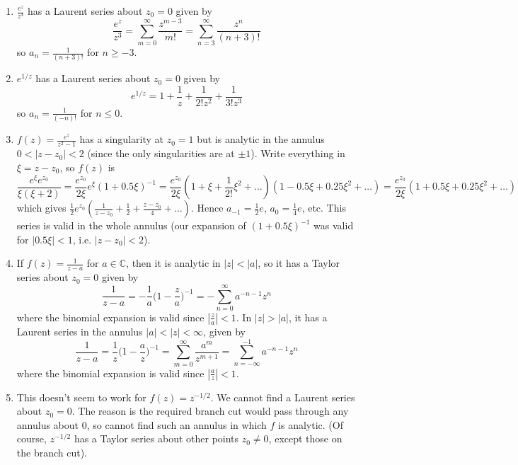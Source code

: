 \documentclass[a4paper]{article}
\begin{document}
\begin{eg}\leavevmode
\begin{enumerate}
    \item $\frac{e^z}{z^3}$ has a Laurent series about $z_0=0$ given by
    $$\frac{e^z}{z^3}=\sum_{m=0}^\infty\frac{z^{m-3}}{m!}=\sum_{n=3}^\infty\frac{z^n}{(n+3)!}$$
    so $a_n=\frac{1}{(n+3)!}$ for $n\geq-3$.
    \item $e^{1/z}$ has a Laurent series about $z_0=0$ given by
    $$e^{1/z}=1+\frac{1}{z}+\frac{1}{2!z^2}+\frac{1}{3!z^3}$$
    so $a_n=\frac{1}{(-n)!}$ for $n\leq 0$.
    \item $f(z)=\frac{e^z}{z^2-1}$ has a singularity at $z_0=1$ but is analytic in the annulus $0<|z-z_0|<2$ (since the only singularities are at $\pm 1$). Write everything in $\xi=z-z_0$, so $f(z)$ is
    $$\frac{e^\xi e^{z_0}}{\xi(\xi+2)}=\frac{e^{z_0}}{2\xi}e^\xi(1+0.5\xi)^{-1}=\frac{e^{z_0}}{2\xi}(1+\xi+\frac{1}{2!}\xi^2+\dots)(1-0.5\xi+0.25\xi^2+\dots)=\frac{e^{z_0}}{2\xi}(1+0.5\xi+0.25\xi^2+\dots)$$
    which gives $\frac{1}{2}e^{z_0}(\frac{1}{z-z_0}+\frac{1}{2}+\frac{z-z_0}{4}+\dots)$. Hence $a_{-1}=\frac{1}{2}e$, $a_0=\frac{1}{4}e$, etc. This series is valid in the whole annulus (our expansion of $(1+0.5\xi)^{-1}$ was valid for $|0.5\xi|<1$, i.e. $|z-z_0|<2$).
    \item If $f(z)=\frac{1}{z-a}$ for $a\in\mathbb{C}$, then it is analytic in $|z|<|a|$, so it has a Taylor series about $z_0=0$ given by
    $$\frac{1}{z-a}=-\frac{1}{a}\bigg(1-\frac{z}{a}\bigg)^{-1}=-\sum_{n=0}^\infty a^{-n-1}z^n$$
    where the binomial expansion is valid since $|\frac{z}{a}|<1$. In $|z|>|a|$, it has a Laurent series in the annulus $|a|<|z|<\infty$, given by
    $$\frac{1}{z-a}=\frac{1}{z}\bigg(1-\frac{a}{z}\bigg)^{-1}=\sum_{m=0}^\infty\frac{a^m}{z^{m+1}}=\sum_{n=-\infty}^{-1}a^{-n-1}z^n$$
    where the binomial expansion is valid since $|\frac{a}{z}|<1$.
    \item This doesn't seem to work for $f(z)=z^{-1/2}$. We cannot find a Laurent series about $z_0=0$. The reason is the required branch cut would pass through any annulus about 0, so cannot find such an annulus in which $f$ is analytic. (Of course, $z^{-1/2}$ has a Taylor series about other points $z_0\neq 0$, except those on the branch cut).
\end{enumerate}
\end{eg}
\end{document}
